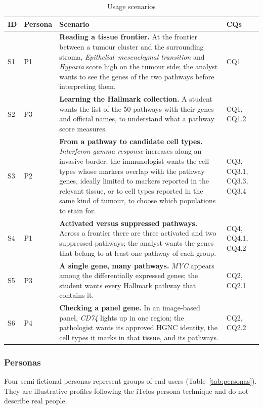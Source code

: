 \begin{table}[htbp]
\centering
\small
\begin{tabularx}{\linewidth}{|l|l|X|l|}
\hline
\textbf{ID} & \textbf{Persona} & \textbf{Scenario} & \textbf{CQs} \\ \hline
S1 & P1 & \textbf{Reading a tissue frontier.} At the frontier between a tumour cluster and the surrounding stroma, \emph{Epithelial--mesenchymal transition} and \emph{Hypoxia} score high on the tumour side; the analyst wants to see the genes of the two pathways before interpreting them. & CQ1 \\ \hline
S2 & P3 & \textbf{Learning the Hallmark collection.} A student wants the list of the 50 pathways with their genes and official names, to understand what a pathway score measures. & CQ1, CQ1.2 \\ \hline
S3 & P2 & \textbf{From a pathway to candidate cell types.} \emph{Interferon gamma response} increases along an invasive border; the immunologist wants the cell types whose markers overlap with the pathway genes, ideally limited to markers reported in the relevant tissue, or to cell types reported in the same kind of tumour, to choose which populations to stain for. & CQ3, CQ3.1, CQ3.3, CQ3.4 \\ \hline
S4 & P1 & \textbf{Activated versus suppressed pathways.} Across a frontier there are three activated and two suppressed pathways; the analyst wants the genes that belong to at least one pathway of each group. & CQ4, CQ4.1, CQ4.2 \\ \hline
S5 & P3 & \textbf{A single gene, many pathways.} \emph{MYC} appears among the differentially expressed genes; the student wants every Hallmark pathway that contains it. & CQ2, CQ2.1 \\ \hline
S6 & P4 & \textbf{Checking a panel gene.} In an image-based panel, \emph{CD74} lights up in one region; the pathologist wants its approved HGNC identity, the cell types it marks in that tissue, and its pathways. & CQ2, CQ2.2 \\ \hline
\end{tabularx}
\caption{Usage scenarios}
\label{tab:scenarios}
\end{table}

\subsubsection{Personas}

Four semi-fictional personas represent groups of end users (Table~\ref{tab:personas}). They are illustrative profiles following the iTelos persona technique and do not describe real people.

